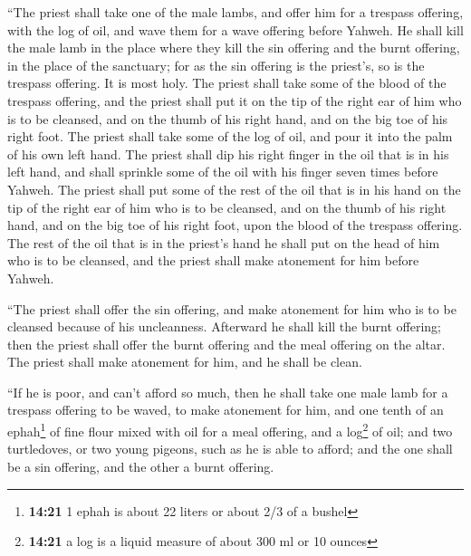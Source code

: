  ``The priest shall take one of the male lambs, and offer
him for a trespass offering, with the log of oil, and wave them for a
wave offering before Yahweh.  He shall kill the male lamb
in the place where they kill the sin offering and the burnt offering, in
the place of the sanctuary; for as the sin offering is the priest's, so
is the trespass offering. It is most holy.  The priest
shall take some of the blood of the trespass offering, and the priest
shall put it on the tip of the right ear of him who is to be cleansed,
and on the thumb of his right hand, and on the big toe of his right
foot.  The priest shall take some of the log of oil, and
pour it into the palm of his own left hand.  The priest
shall dip his right finger in the oil that is in his left hand, and
shall sprinkle some of the oil with his finger seven times before
Yahweh.  The priest shall put some of the rest of the oil
that is in his hand on the tip of the right ear of him who is to be
cleansed, and on the thumb of his right hand, and on the big toe of his
right foot, upon the blood of the trespass offering.  The
rest of the oil that is in the priest's hand he shall put on the head of
him who is to be cleansed, and the priest shall make atonement for him
before Yahweh.

 ``The priest shall offer the sin offering, and make
atonement for him who is to be cleansed because of his uncleanness.
Afterward he shall kill the burnt offering;  then the
priest shall offer the burnt offering and the meal offering on the
altar. The priest shall make atonement for him, and he shall be clean.

 ``If he is poor, and can't afford so much, then he shall
take one male lamb for a trespass offering to be waved, to make
atonement for him, and one tenth of an ephah\footnote{\textbf{14:21} 1
  ephah is about 22 liters or about 2/3 of a bushel} of fine flour mixed
with oil for a meal offering, and a log\footnote{\textbf{14:21} a log is
  a liquid measure of about 300 ml or 10 ounces} of oil; 
and two turtledoves, or two young pigeons, such as he is able to afford;
and the one shall be a sin offering, and the other a burnt offering.

